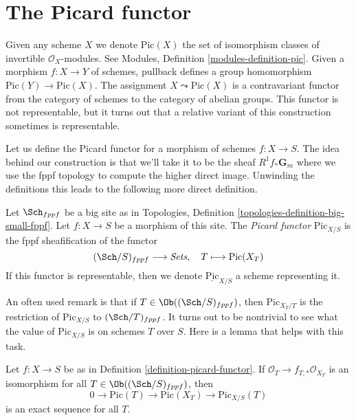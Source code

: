 \section{The Picard functor}
\label{section-picard-functor}

\noindent
Given any scheme $X$ we denote $\text{Pic}(X)$ the set of isomorphism
classes of invertible $\mathcal{O}_X$-modules.
See Modules, Definition \ref{modules-definition-pic}.
Given a morphism $f : X \to Y$ of schemes, pullback defines
a group homomorphism $\text{Pic}(Y) \to \text{Pic}(X)$.
The assignment
$X \leadsto \text{Pic}(X)$ is a contravariant functor from the category
of schemes to the category of abelian groups. This functor is not
representable, but it turns out that a relative variant of this
construction sometimes is representable.

\medskip\noindent
Let us define the Picard functor for a morphism of schemes $f : X \to S$.
The idea behind our construction is that we'll take it to be the sheaf
$R^1f_*\mathbf{G}_m$ where we use the fppf topology to compute the higher
direct image. Unwinding the definitions this leads to the following more
direct definition.

\begin{definition}
\label{definition-picard-functor}
Let $\Sch_{fppf}$ be a big site as in
Topologies, Definition \ref{topologies-definition-big-small-fppf}.
Let $f : X \to S$ be a morphism of this site. The {\it Picard functor}
$\text{Pic}_{X/S}$ is the fppf sheafification of the functor
$$
(\Sch/S)_{fppf} \longrightarrow \textit{Sets},\quad
T \longmapsto \text{Pic}(X_T)
$$
If this functor is representable, then we denote
$\underline{\text{Pic}}_{X/S}$ a scheme representing it.
\end{definition}

\noindent
An often used remark is that if $T \in \Ob((\Sch/S)_{fppf})$, then
$\text{Pic}_{X_T/T}$ is the restriction of $\text{Pic}_{X/S}$ to
$(\Sch/T)_{fppf}$.
It turns out to be nontrivial to see what the value of $\text{Pic}_{X/S}$
is on schemes $T$ over $S$. Here is a lemma that helps with this
task.

\begin{lemma}
\label{lemma-flat-geometrically-connected-fibres}
Let $f : X \to S$ be as in Definition \ref{definition-picard-functor}.
If $\mathcal{O}_T \to f_{T, *}\mathcal{O}_{X_T}$ is an isomorphism
for all $T \in \Ob((\Sch/S)_{fppf})$, then
$$
0 \to \text{Pic}(T) \to \text{Pic}(X_T) \to \text{Pic}_{X/S}(T)
$$
is an exact sequence for all $T$.
\end{lemma}

